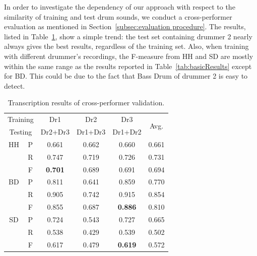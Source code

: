 \documentclass{article}
\newcommand{\secref}[1]{\mbox{Section~\ref{#1}}}
\newcommand{\tabref}[1]{\mbox{Table~\ref{#1}}}
\begin{document}
In order to investigate the dependency of our approach with respect to the similarity of training and test drum sounds, we conduct a cross-performer evaluation as mentioned in \secref{subsec:evaluation procedure}. %
The results, listed in \tabref{tab:crossResults}, show a simple trend: the test set containing drummer 2 nearly always gives the best results, regardless of the training set. Also, when training with different drummer's recordings, the F-measure from HH and SD are mostly within the same range as the results reported in \tabref{tab:basicResults} except for BD. This could be due to the fact that Bass Drum of drummer 2 is easy to detect.
\begin{table}[t]
\begin{footnotesize}
\begin{center}
\begin{tabular}{|c|c|c|c|c|c|}
\hline
\multicolumn{2}{|c|}{Training} & Dr1            & Dr2     & Dr3            & \multirow{2}{*}{Avg.} \\ \cline{1-5}
\multicolumn{2}{|c|}{Testing}  & Dr2+Dr3        & Dr1+Dr3 & Dr1+Dr2        &                       \\ \hline
HH             & P             & 0.661          & 0.662   & 0.660          & 0.661                 \\ \hline
               & R             & 0.747          & 0.719   & 0.726          & 0.731                 \\ \hline
               & F             & \textbf{0.701} & 0.689   & 0.691          & 0.694                 \\ \hline
BD             & P             & 0.811          & 0.641   & 0.859          & 0.770                 \\ \hline
               & R             & 0.905          & 0.742   & 0.915          & 0.854                 \\ \hline
               & F             & 0.855          & 0.687   & \textbf{0.886} & 0.810                 \\ \hline
SD             & P             & 0.724          & 0.543   & 0.727          & 0.665                 \\ \hline
               & R             & 0.538          & 0.429   & 0.539          & 0.502                 \\ \hline
               & F             & 0.617          & 0.479   & \textbf{0.619} & 0.572                 \\ \hline
\end{tabular}
 \caption{Transcription results of cross-performer validation.}
 \label{tab:crossResults}
 \end{center}
\end{footnotesize}
\end{table}
\end{document}
